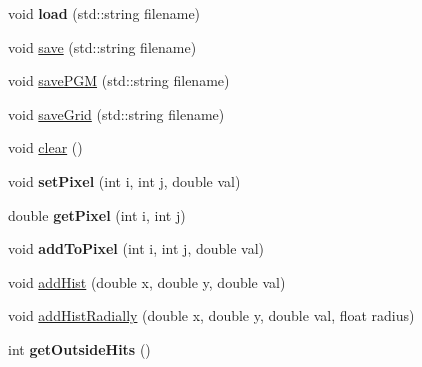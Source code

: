 \begin{DoxyCompactItemize}
\item 
\hypertarget{classImage2D_afe3cf97c37486e56e49adcf44dd10d3a}{
void {\bfseries load} (std::string filename)}
\label{classImage2D_afe3cf97c37486e56e49adcf44dd10d3a}

\item 
void \hyperlink{classImage2D_a701ac83af425942beb093fff80880b04}{save} (std::string filename)
\item 
\hypertarget{classImage2D_ad6f25f96ba0f4b0e480995a83e9c6919}{
void \hyperlink{classImage2D_ad6f25f96ba0f4b0e480995a83e9c6919}{savePGM} (std::string filename)}
\label{classImage2D_ad6f25f96ba0f4b0e480995a83e9c6919}

\item 
\hypertarget{classImage2D_a1951a4240aba5293c7f2879b4243c590}{
void \hyperlink{classImage2D_a1951a4240aba5293c7f2879b4243c590}{saveGrid} (std::string filename)}
\label{classImage2D_a1951a4240aba5293c7f2879b4243c590}

\item 
\hypertarget{classImage2D_aec45f19b3ba3256cac22a321179cb5d9}{
void \hyperlink{classImage2D_aec45f19b3ba3256cac22a321179cb5d9}{clear} ()}
\label{classImage2D_aec45f19b3ba3256cac22a321179cb5d9}

\item 
\hypertarget{classImage2D_a567f81e75a048d7659f66563af9bad2b}{
void {\bfseries setPixel} (int i, int j, double val)}
\label{classImage2D_a567f81e75a048d7659f66563af9bad2b}

\item 
\hypertarget{classImage2D_a03cfaa176ee51e6663196f8a120a24a8}{
double {\bfseries getPixel} (int i, int j)}
\label{classImage2D_a03cfaa176ee51e6663196f8a120a24a8}

\item 
\hypertarget{classImage2D_a523442590845b45974b1987f24d97c14}{
void {\bfseries addToPixel} (int i, int j, double val)}
\label{classImage2D_a523442590845b45974b1987f24d97c14}

\item 
void \hyperlink{classImage2D_a1373c4a48a3393f3dc8b0a6382ae0990}{addHist} (double x, double y, double val)
\item 
void \hyperlink{classImage2D_afa47c6e966ae69c72bb58e97f1e58858}{addHistRadially} (double x, double y, double val, float radius)
\item 
\hypertarget{classImage2D_acdf9aed4054987b922b3de8e3aa22b72}{
int {\bfseries getOutsideHits} ()}
\label{classImage2D_acdf9aed4054987b922b3de8e3aa22b72}


\end{DoxyCompactItemize}

